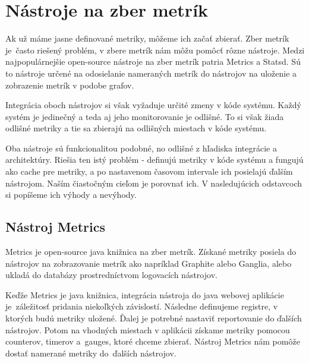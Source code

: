 \documentclass[a4paper, upjsfrontpage, disablespecwarning, thesismargins, thesislinespacing]{rnthesis}
\begin{document}
\chapter{Nástroje na zber metrík}

Ak už máme jasne definované metriky, môžeme ich začať zbierať.
Zber metrík je~často riešený problém, v zbere metrík nám môžu pomôcť rôzne nástroje.
Medzi naj\-populár\-nejšie open-source nástroje na zber metrík patria Metrics a Statsd.
Sú to nástroje určené na odosielanie nameraných metrík do nástrojov na uloženie a zobrazenie metrík v podobe grafov.

Integrácia oboch nástrojov si však vyžaduje určité zmeny v kóde systému.
Každý systém je jedinečný a teda aj jeho monitorovanie je odlišné.
To si však žiada odlišné metriky a tie sa zbierajú na odlišných miestach v kóde systému.

Oba nástroje sú funkcionalitou podobné, no odlišné z hľadiska integrácie a architektúry.
Riešia ten istý problém - definujú metriky v kóde systému a fungujú ako cache pre metriky, a po nastavenom časovom intervale ich posielajú ďalším nástrojom.
Naším čiastočným cieľom je porovnať ich.
V nasledujúcich odstavcoch si popíšeme ich výhody a nevýhody.


\section{Nástroj Metrics}

Metrics je open-source java knižnica na zber metrík.
Získané metriky posiela do nástrojov na zobrazovanie metrík ako napríklad Graphite alebo Ganglia, alebo ukladá do databázy prostredníctvom logovacích nástrojov.

Keďže Metrics je java knižnica, integrácia nástroja do java webovej aplikácie je~záležitosť pridania niekoľkých závislostí.
Následne definujeme registre, v ktorých budú metriky uložené.
Ďalej je potrebné nastaviť reportovanie do ďalších nástrojov.
Potom na vhodných miestach v aplikácii získame metriky pomocou counterov, timerov a~gauges, ktoré chceme zbierať.
Nástroj Metrics nám pomôže dostať namerané metriky do~ďalších nástrojov.
\end{document}
